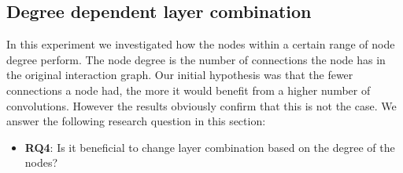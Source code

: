 \subsection{Degree dependent layer combination}\label{subsec:degree-experiment}
In this experiment we investigated how the nodes within a certain range of node degree perform.
The node degree is the number of connections the node has in the original interaction graph.
Our initial hypothesis was that the fewer connections a node had, the more it would benefit from a higher number of convolutions.
However the results obviously confirm that this is not the case.
We answer the following research question in this section:
\begin{itemize}
    \item \textbf{RQ4}: Is it beneficial to change layer combination based on the degree of the nodes?
\end{itemize}

